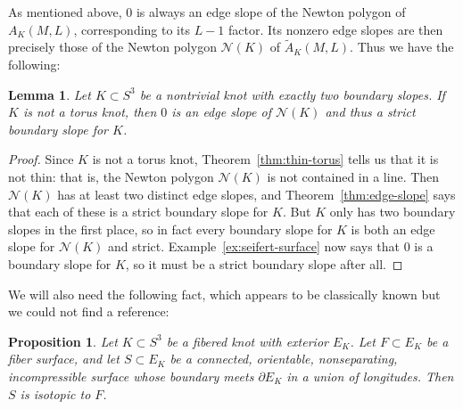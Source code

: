 \documentclass[11pt]{amsart}
\newtheorem {lemma}[theorem]{Lemma}
\newtheorem {proposition}[theorem]{Proposition}
\numberwithin{equation}{section}
\numberwithin{theorem}{section}
\theoremstyle{definition}
\newcommand{\cN}{\mathcal{N}}
\begin{document}
As mentioned  above, $0$ is always an edge slope of the Newton polygon of $A_K(M,L)$, corresponding to its $L-1$ factor. Its nonzero edge slopes are then precisely those of the Newton polygon $\cN(K)$ of $\tilde{A}_K(M,L)$.  Thus we have the following:

\begin{lemma} \label{lem:0-strict}
Let $K \subset S^3$ be a nontrivial knot with exactly two boundary slopes.  If $K$ is not a torus knot, then $0$ is an edge slope of $\cN(K)$ and thus a strict boundary slope for $K$. 
\end{lemma}

\begin{proof}
Since $K$ is not a torus knot, Theorem~\ref{thm:thin-torus} tells us that it is not thin: that is, the Newton polygon $\cN(K)$ is not contained in a line.  Then $\cN(K)$ has at least two distinct edge slopes, and Theorem~\ref{thm:edge-slope} says that each of these is a strict boundary slope for $K$.  But $K$ only has two boundary slopes in the first place, so in fact every boundary slope for $K$ is both an edge slope for $\cN(K)$ and strict.  Example~\ref{ex:seifert-surface} now says that $0$ is a boundary slope for $K$, so it must be a strict boundary slope after all.
\end{proof}

We will also need the following fact, which appears to be classically known but we could not find a reference:

\begin{proposition} \label{prop:nonseparating-surface-in-fibered-exterior}
Let $K \subset S^3$ be a fibered knot with exterior $E_K$.  Let $F \subset E_K$ be a fiber surface, and let $S \subset E_K$ be a connected, orientable, nonseparating, incompressible surface whose boundary meets $\partial E_K$ in a union of longitudes.  Then $S$ is isotopic to $F$.
\end{proposition}
\end{document}
